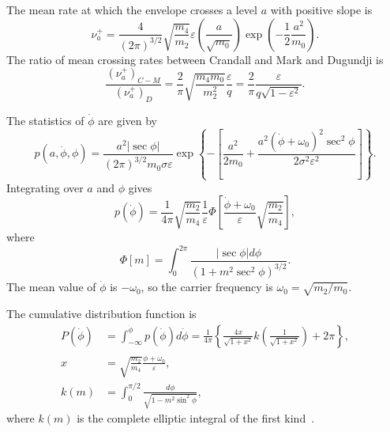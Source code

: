 \documentclass[12pt]{article}
\theoremstyle{plain}
\theoremstyle{definition}
\theoremstyle{remark}
\theoremstyle{plain}
\theoremstyle{definition}
\begin{document}
The mean rate at which the envelope crosses a level $a$ with positive slope is
\begin{equation}
    \nu_a^+ = \frac{4}{(2\pi)^{3/2}} \sqrt{\frac{m_4}{m_2}} \varepsilon \left( \frac{a}{\sqrt{m_0}} \right) \exp\left( -\frac{1}{2} \frac{a^2}{m_0} \right).
    \label{eq:crandall_crossing}
\end{equation}
The ratio of mean crossing rates between Crandall and Mark and Dugundji is
\begin{equation}
    \frac{(\nu_a^+)_{C-M}}{(\nu_a^+)_D} = \frac{2}{\pi} \sqrt{\frac{m_4 m_0}{m_2^2}} \frac{\varepsilon}{q} = \frac{2}{\pi} \frac{\varepsilon}{q \sqrt{1 - \varepsilon^2}}.
    \label{eq:crossing_ratio}
\end{equation}

The statistics of $\dot{\phi}$ are given by
\begin{equation}
    p(a, \dot{\phi}, \phi) = \frac{a^2 |\sec \phi|}{(2\pi)^{3/2} m_0 \sigma \varepsilon} \exp\left\{ -\left[ \frac{a^2}{2 m_0} + \frac{a^2 (\dot{\phi} + \omega_0)^2 \sec^2 \phi}{2 \sigma^2 \varepsilon^2} \right] \right\}.
\end{equation}
Integrating over $a$ and $\phi$ gives
\begin{equation}
    p(\dot{\phi}) = \frac{1}{4\pi} \sqrt{\frac{m_2}{m_4}} \frac{1}{\varepsilon} \Phi\left[ \frac{\dot{\phi} + \omega_0}{\varepsilon} \sqrt{\frac{m_2}{m_4}} \right],
\end{equation}
where
\begin{equation}
    \Phi[m] = \int_0^{2\pi} \frac{|\sec \phi| d\phi}{(1 + m^2 \sec^2 \phi)^{3/2}}.
\end{equation}
The mean value of $\dot{\phi}$ is $-\omega_0$, so the carrier frequency is $\omega_0 = \sqrt{m_2/m_0}$.

The cumulative distribution function is
\begin{align}
    P(\dot{\phi}) &= \int_{-\infty}^{\dot{\phi}} p(\dot{\phi}) d\dot{\phi} = \frac{1}{4\pi} \left\{ \frac{4x}{\sqrt{1 + x^2}} k\left( \frac{1}{\sqrt{1 + x^2}} \right) + 2\pi \right\}, \\
    x &= \sqrt{\frac{m_2}{m_4}} \frac{\dot{\phi} + \omega_0}{\varepsilon}, \\
    k(m) &= \int_0^{\pi/2} \frac{d\phi}{\sqrt{1 - m^2 \sin^2 \phi}},
\end{align}
where $k(m)$ is the complete elliptic integral of the first kind~\cite{abramowitz1965}.
\end{document}
